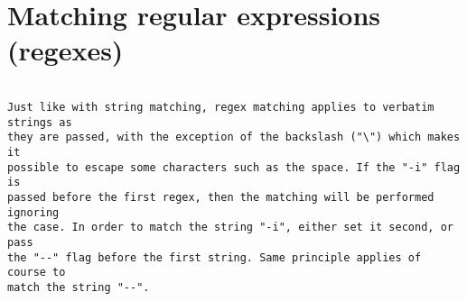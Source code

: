 
\section{Matching regular expressions (regexes)}

\begin{verbatim}

Just like with string matching, regex matching applies to verbatim strings as
they are passed, with the exception of the backslash ("\") which makes it
possible to escape some characters such as the space. If the "-i" flag is
passed before the first regex, then the matching will be performed ignoring
the case. In order to match the string "-i", either set it second, or pass
the "--" flag before the first string. Same principle applies of course to
match the string "--".


\end{verbatim}
